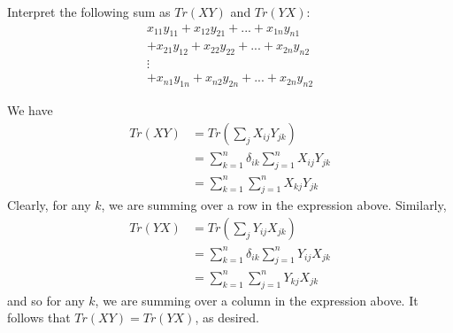\documentclass[12pt,onecolumn]{article}
\begin{document}
\begin{exercise}
Interpret the following sum as $Tr(XY)$ and $Tr(YX)$:
\begin{align*}
      x_{11}y_{11} +  x_{12}y_{21} + ... +  x_{1n}y_{n1}\\
    + x_{21}y_{12} +  x_{22}y_{22} + ... +  x_{2n}y_{n2}\\
    \vdots \quad \\
    + x_{n1}y_{1n} +  x_{n2}y_{2n} + ... +  x_{2n}y_{n2}
\end{align*}
\end{exercise}
\begin{answer}
We have
\begin{align*}
    Tr(XY) &= Tr(\sum_j X_{ij}Y_{jk}) \\
    &= \sum_{k=1}^n \delta_{ik}\sum_{j=1}^n X_{ij}Y_{jk} \\
    &= \sum_{k=1}^n\sum_{j=1}^n  X_{kj}Y_{jk}
\end{align*}
Clearly, for any $k$, we are summing over a row in the expression above. Similarly,
\begin{align*}
    Tr(YX) &= Tr(\sum_j Y_{ij}X_{jk}) \\
    &= \sum_{k=1}^n \delta_{ik}\sum_{j=1}^n Y_{ij}X_{jk} \\
    &= \sum_{k=1}^n\sum_{j=1}^n  Y_{kj}X_{jk}
\end{align*}
and so for any $k$, we are summing over a column in the expression above. It follows that $Tr(XY)=Tr(YX)$, as desired.
\end{answer}
\end{document}
